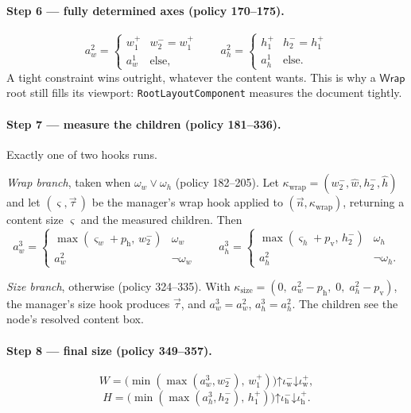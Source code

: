 \documentclass[11pt,a4paper]{article}
\newcommand{\Wrap}{\mathsf{Wrap}}
\newcommand{\Iw}{\iota_{\mathrm{w}}}
\newcommand{\Ih}{\iota_{\mathrm{h}}}
\newcommand{\clampL}{\mathord{\uparrow}}
\newcommand{\clampH}{\mathord{\downarrow}}
\newcommand{\jv}[1]{\texttt{#1}}       %
\theoremstyle{definition}
\theoremstyle{plain}
\theoremstyle{remark}
\begin{document}
\paragraph{Step 6 --- fully determined axes (policy 170--175).}
\[
  a^2_w = \begin{cases} w^+_1 & w^-_2 = w^+_1 \\ a^1_w & \text{else,}\end{cases}
  \qquad
  a^2_h = \begin{cases} h^+_1 & h^-_2 = h^+_1 \\ a^1_h & \text{else.}\end{cases}
\]
A tight constraint wins outright, whatever the content wants. This is why a
$\Wrap$ root still fills its viewport: \jv{RootLayoutComponent} measures the
document tightly.

\paragraph{Step 7 --- measure the children (policy 181--336).}
Exactly one of two hooks runs.

\emph{Wrap branch}, taken when $\omega_w \vee \omega_h$ (policy 182--205). Let
$\kappa_{\mathrm{wrap}} = (w^-_2, \hat w, h^-_2, \hat h)$ and let
$(\varsigma, \vec{\tau}\,)$ be the manager's wrap hook applied to
$(\vec{n}, \kappa_{\mathrm{wrap}})$, returning a content size $\varsigma$ and the
measured children. Then
\[
  a^3_w = \begin{cases}
    \max(\varsigma_w + p_{\mathrm{h}},\, w^-_2) & \omega_w \\
    a^2_w & \neg\omega_w
  \end{cases}
  \qquad
  a^3_h = \begin{cases}
    \max(\varsigma_h + p_{\mathrm{v}},\, h^-_2) & \omega_h \\
    a^2_h & \neg\omega_h .
  \end{cases}
\]

\emph{Size branch}, otherwise (policy 324--335). With
$\kappa_{\mathrm{size}} = (0,\; a^2_w - p_{\mathrm{h}},\; 0,\; a^2_h -
p_{\mathrm{v}})$, the manager's size hook produces $\vec{\tau}$, and
$a^3_w = a^2_w$, $a^3_h = a^2_h$. The children see the node's resolved content
box.

\paragraph{Step 8 --- final size (policy 349--357).}
\[
  W = \bigl(\min(\max(a^3_w, w^-_2),\, w^+_1)\bigr) \clampL \Iw^- \clampH \Iw^+,
\]
\[
  H = \bigl(\min(\max(a^3_h, h^-_2),\, h^+_1)\bigr) \clampL \Ih^- \clampH \Ih^+ .
\]
\end{document}

